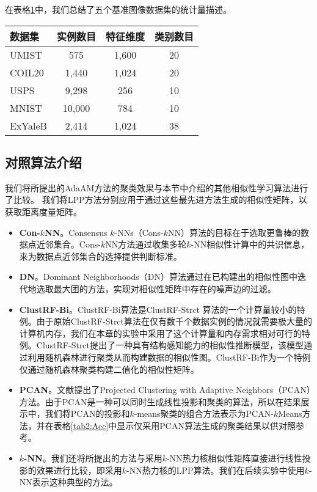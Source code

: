 在表格\ref{tab2:Data}中，我们总结了五个基准图像数据集的统计量描述。

\begin{table}[t]
	\label{tab2:Data}
	\centering
	\begin{tabular}{l c c c}
		\toprule
		数据集 & 实例数目 & 特征维度 & 类别数目\\ 
		\midrule
		UMIST & 575 & 1,600 & 20\\
		COIL20 & 1,440 & 1,024 & 20\\
		USPS & 9,298 & 256 & 10\\
		MNIST & 10,000 & 784 & 10\\
		ExYaleB & 2,414 & 1,024 & 38\\
		\bottomrule
	\end{tabular}
\end{table}

\subsection{对照算法介绍}
我们将所提出的AdaAM方法的聚类效果与本节中介绍的其他相似性学习算法进行了比较。 我们将LPP方法分别应用于通过这些最先进方法生成的相似性矩阵，以获取距离度量矩阵。

\begin{itemize}
	\item \textbf{Con-$k$NN}。Consensus $k$-NNs（Cons-$k$NN）算法\cite{premachandran2013consensus}的目标在于选取更鲁棒的数据点近邻集合。Cons-$k$NN方法通过收集多轮$k$-NN相似性计算中的共识信息，来为数据点近邻集合的选择提供判断标准。
	\item \textbf{DN}。Dominant Neighborhoods（DN）算法\cite{pavan2007dominant}通过在已构建出的相似性图中迭代地选取最大团的方法，实现对相似性矩阵中存在的噪声边的过滤。
	\item \textbf{ClustRF-Bi}。ClustRF-Bi算法\cite{criminisi2012decision,pei2013unsupervised}是ClustRF-Strct \cite{zhu2014constructing}算法的一个计算量较小的特例。由于原始ClustRF-Strct算法在仅有数千个数据实例的情况就需要极大量的计算机内存，我们在本章的实验中采用了这个计算量和内存需求相对可行的特例。ClustRF-Strct提出了一种具有结构感知能力的相似性推断模型，该模型通过利用随机森林进行聚类从而构建数据的相似性图。ClustRF-Bi作为一个特例仅通过随机森林聚类构建二值化的相似性矩阵。
	\item \textbf{PCAN}。文献\parencite{nie2014clustering}提出了Projected Clustering with Adaptive Neighbors（PCAN）方法。由于PCAN是一种可以同时生成线性投影和聚类的算法，所以在结果展示中，我们将PCAN的投影和$k$-means聚类的组合方法表示为PCAN-$k$Means方法，并在表格\ref{tab2:Acc}中显示仅采用PCAN算法生成的聚类结果以供对照参考。
	\item \textbf{$k$-NN}。我们还将所提出的方法与采用$k$-NN热力核相似性矩阵直接进行线性投影的效果进行比较，即采用$k$-NN热力核的LPP算法。我们在后续实验中使用$k$-NN表示这种典型的方法。
\end{itemize}

